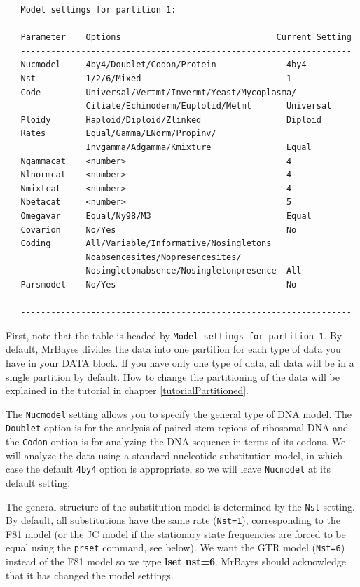 \documentclass[12pt]{book}
\begin{document}
\begin{singlespacing}
\small
\begin{verbatim}
   Model settings for partition 1:

   Parameter    Options                               Current Setting
   ------------------------------------------------------------------
   Nucmodel     4by4/Doublet/Codon/Protein              4by4
   Nst          1/2/6/Mixed                             1
   Code         Universal/Vertmt/Invermt/Yeast/Mycoplasma/
                Ciliate/Echinoderm/Euplotid/Metmt       Universal
   Ploidy       Haploid/Diploid/Zlinked                 Diploid
   Rates        Equal/Gamma/LNorm/Propinv/
                Invgamma/Adgamma/Kmixture               Equal
   Ngammacat    <number>                                4
   Nlnormcat    <number>                                4
   Nmixtcat     <number>                                4
   Nbetacat     <number>                                5
   Omegavar     Equal/Ny98/M3                           Equal
   Covarion     No/Yes                                  No
   Coding       All/Variable/Informative/Nosingletons
                Noabsencesites/Nopresencesites/
                Nosingletonabsence/Nosingletonpresence  All
   Parsmodel    No/Yes                                  No

   ------------------------------------------------------------------
\end{verbatim}
\normalsize
\end{singlespacing}

First, note that the table is headed by \texttt{Model settings for partition 1}. By default, MrBayes divides
 the data into one partition for each type of data you have in your DATA block. If you have only one type of
 data, all data will be in a single partition by default. How to change the partitioning of the data will be
 explained in the tutorial in chapter \ref{tutorialPartitioned}.

The \texttt{Nucmodel} setting allows you to specify the general type of DNA model. The \texttt{Doublet}
 option is for the analysis of paired stem regions of ribosomal DNA and the \texttt{Codon} option is for
 analyzing the DNA sequence in terms of its codons. We will analyze the data using a standard nucleotide
 substitution model, in which case the default \texttt{4by4} option is appropriate, so we will leave
 \texttt{Nucmodel} at its default setting.

The general structure of the substitution model is determined by the \texttt{Nst} setting. By default, all
 substitutions have the same rate (\texttt{Nst=1}), corresponding to the F81 model (or the JC model if the
 stationary state frequencies are forced to be equal using the \texttt{prset} command, see below). We want
 the GTR model (\texttt{Nst=6}) instead of the F81 model so we type \textbf{lset nst=6}. MrBayes should
 acknowledge that it has changed the model settings.
\end{document}
